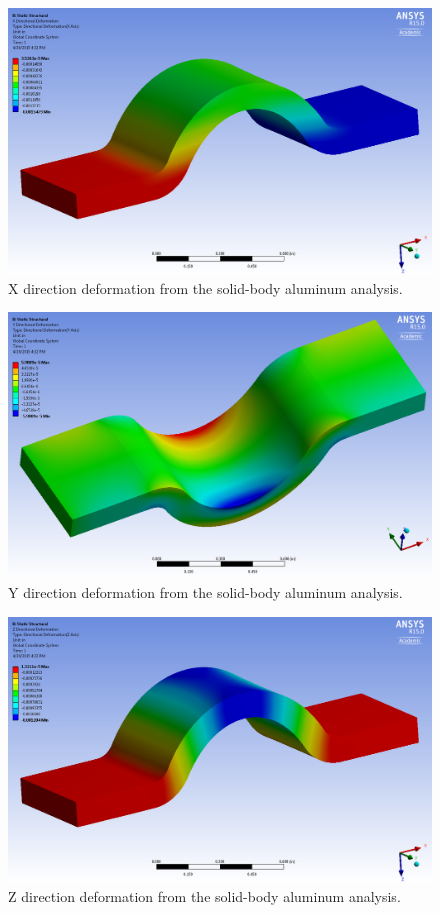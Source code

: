 \begin{figure}[htp]
\centering
\includegraphics[width=1\textwidth]{./figures/fea/fea-solid-al-def-x}
\caption{X direction deformation from the solid-body aluminum analysis.}
\label{fig:fea-solid-al-def-x}
\end{figure}

\begin{figure}[htp]
\centering
\includegraphics[width=1\textwidth]{./figures/fea/fea-solid-al-def-y}
\caption{Y direction deformation from the solid-body aluminum analysis.}
\label{fig:fea-solid-al-def-y}
\end{figure}

\begin{figure}[htp]
\centering
\includegraphics[width=1\textwidth]{./figures/fea/fea-solid-al-def-z}
\caption{Z direction deformation from the solid-body aluminum analysis.}
\label{fig:fea-solid-al-def-z}
\end{figure}


